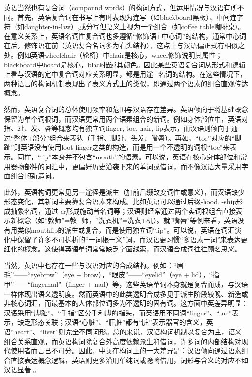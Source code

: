\documentclass[10pt]{ctexart}
\begin{document}
\begin{enumerate}
    英语当然也有复合词（compound words）的构词方式，但运用情况与汉语有所不同。首先，英语复合词在书写上有时表现为连写（如blackboard黑板）、中间连字符（如daughter-in-law）,或分写但语义上视为一个组合（如coffee table咖啡桌）。在意义关系上，英语名词性复合词也多遵循``修饰语+中心词''的结构，通常中心词在后，修饰语在前（英语复合名词多为右头结构），这点上与汉语偏正式有相似之处。例如英语wheelchair（轮椅）中chair是核心，wheel修饰说明其属性；blackboard中board是核心，black描述其颜色。因此某些英语复合词从形式和逻辑上看与汉语的定中复合词对应关系明显，都是用途+名词的结构。在这些情况下，两种语言的构词机制表现出了表义方式上的类似，即通过两个语素的组合直观传达概念。

    然而，英语复合词的总体使用频率和范围与汉语存在差异。英语倾向于将基础概念保留为单个词根词，而汉语更常用两个语素组合的新词。例如身体部位中，英语对指、趾、发、唇等概念均有独立词finger, toe, hair, lip表示，而汉语则倾向于通过``整体+部分''组合来表达（手指、脚趾、头发、嘴唇）。再如，``toe''对应的``脚趾''则英语没有使用foot-finger之类的构造，而是用一个不透明的词根``toe''来表示。同样，``lip''本身并不包含``mouth''的语素。可以说，英语在核心身体部位和常用器物部件的词汇中，更偏好历史沿袭下来的单词或借词，而不像汉语大量采用字面组合的新造词。

    此外，英语构词更常见另一途径是派生（加前后缀改变词性或意义），而汉语缺少形态变化，其新词主要靠复合语素来构成。比如英语可以通过后缀-hood, -ship形成抽象名词，通过-er形成施动者名词等；汉语则经常通过两个实词根组合直接表示新概念（如``教师''=教+师，``洗衣机''=洗衣+机）。就``嘴唇''等例来看，英语没有用类似mouthlip的派生或复合，而是使用独立词``lip''。可以说，英语在词汇演化中保留了许多不可拆析的``一词根一义''词，而汉语更习惯``多语素一词''来表达更细化的概念。这使得英语单词常常缺乏字面线索，而汉语合成词往往顾名思义。

    当然，英语中也存在一些与汉语对应的合成结构。例如：``眉毛''——``eyebrow''（eye + brow），``眼皮''——``eyelid''（eye + lid），``指甲''——``fingernail''（finger + nail）等，这些英语单词本身就是复合而成，与汉语一样体现出语义透明度。然而英语中的此类透明合成多见于派生阶段较晚、新造或非核心词汇，而最基本的人体部位词多为不透明的固有词。这方面中英差异明显：汉语采用``脚趾''、``手指''区分手和脚的指头，而英语用不同词``finger''、``toe''表示，缺乏形态关联；汉语``心脏''、``肝脏''都有``脏''表示器官的含义，英语``heart''、``liver''则完全不同词形。总的来说，汉语构词机制以复合为主，语义组合关系直观，而英语构词除复合外高度依赖派生和借词，许多词的内部结构对现代使用者而言已不可分。因此，中英在构词上的一大差异是：汉语倾向通过语素组合直接表达概念逻辑，英语则更多沿用单纯词或隐喻借用，词形与含义的对应不如汉语显著 。


\end{enumerate}
\end{document}

